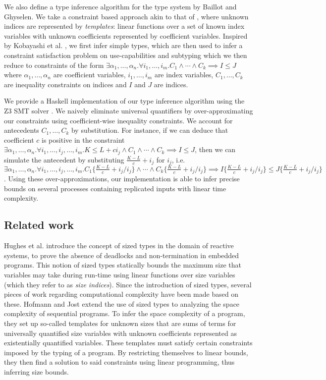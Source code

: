 We also define a type inference algorithm for the type system by Baillot and Ghyselen. We take a constraint based approach akin to that of \cite{HofmannAndJost2003,HofmannAndHoffmann2010,HoffmannEtAl2012,KobayashiEtAl2000,Kobayashi2005,Lhoussaine2004}, where unknown indices are represented by \textit{templates}: linear functions over a set of known index variables with unknown coefficients represented by coefficient variables. Inspired by  Kobayashi et al. \cite{KobayashiEtAl2000}, we first infer simple types, which are then used to infer a constraint satisfaction problem on use-capabilities and subtyping which we then reduce to constraints of the form $\exists\alpha_1,\dots,\alpha_n.\forall i_1,\dots,i_m.C_1\land\cdots\land C_k \implies I \leq J$ where $\alpha_1,\dots,\alpha_n$ are coefficient variables, $i_1,\dots,i_m$ are index variables, $C_1,\dots,C_k$ are inequality constraints on indices and $I$ and $J$ are indices.

We provide a Haskell implementation of our type inference algorithm using the Z3 SMT solver \cite{Z3}. We naively eliminate universal quantifiers by over-approximating our constraints using coefficient-wise inequality constraints. We account for antecedents $C_1,\dots,C_k$ by substitution. For instance, if we can deduce that coefficient $c$ is positive in the constraint $\exists\alpha_1,\dots,\alpha_n.\forall i_1,\dots,i_j,\dots,i_m.K \leq L + ci_j \land C_1 \land \cdots \land C_k \implies I \leq J$, then we can simulate the antecedent by substituting $\frac{K-L}{c} + i_j$ for $i_j$, i.e. $\exists\alpha_1,\dots,\alpha_n.\forall i_1,\dots,i_j,\dots,i_m.C_1\{\frac{K-L}{c} + i_j/i_j\} \land \cdots \land C_k\{\frac{K-L}{c} + i_j/i_j\} \implies I\{\frac{K-L}{c} + i_j/i_j\} \leq J\{\frac{K-L}{c} + i_j/i_j\}$. Using these over-approximations, our implementation is able to infer precise bounds on several processes containing replicated inputs with linear time complexity.

\subsection{Related work}\label{sec:relatedwork}
Hughes et al. \cite{HughesEtAl1996} introduce the concept of sized types in the domain of reactive systems, to prove the absence of deadlocks and non-termination in embedded programs. This notion of sized types statically bounds the maximum size that variables may take during run-time using linear functions over size variables (which they refer to as \textit{size indices}). Since the introduction of sized types, several pieces of work regarding computational complexity have been made based on these. Hofmann and Jost \cite{HofmannAndJost2003} extend the use of sized types to analyzing the space complexity of sequential programs. To infer the space complexity of a program, they set up so-called templates for unknown sizes that are sums of terms for universally quantified size variables with unknown coefficients represented as existentially quantified variables. These templates must satisfy certain constraints imposed by the typing of a program. By restricting themselves to linear bounds, they then find a solution to said constraints using linear programming, thus inferring size bounds.

